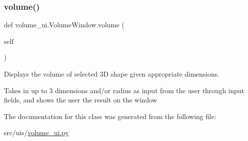 \subsubsection{\texorpdfstring{volume()}{volume()}}
{\footnotesize\ttfamily def volume\+\_\+ui.\+Volume\+Window.\+volume (\begin{DoxyParamCaption}\item[{}]{self }\end{DoxyParamCaption})}



Displays the volume of selected 3D shape given appropriate dimensions. 

Takes in up to 3 dimensions and/or radius as input from the user through input fields, and shows the user the result on the window 

The documentation for this class was generated from the following file\+:\begin{DoxyCompactItemize}
\item 
src/uis/\hyperlink{volume__ui_8py}{volume\+\_\+ui.\+py}\end{DoxyCompactItemize}
